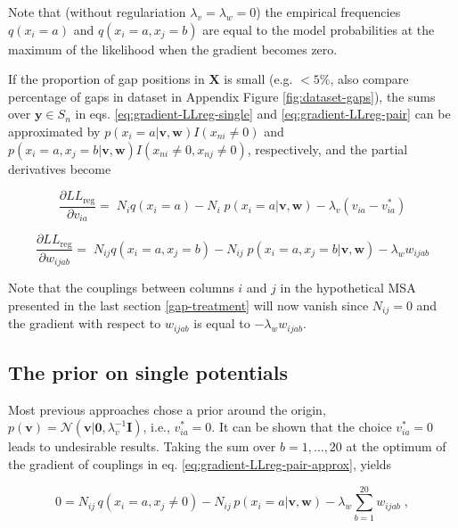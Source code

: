 \documentclass[11pt,a4paper,twoside]{book}
\newcommand{\eq}{\!=\!}
\newcommand{\Gauss}{\mathcal{N}}
\newcommand{\I}{\mathbf{I}}
\newcommand{\LLreg}{L\!L_\mathrm{reg}}
\newcommand{\Sn}{S_n}
\renewcommand{\v}{\mathbf{v}}
\newcommand{\via}{v_{ia}}
\newcommand{\w}{\mathbf{w}}
\newcommand{\wijab}{w_{ijab}}
\newcommand{\X}{\mathbf{X}}
\theoremstyle{definition}
\theoremstyle{definition}
\theoremstyle{remark}
\begin{document}
Note that (without regulariation \(\lambda_v = \lambda_w = 0\)) the
empirical frequencies \(q(x_i \eq a)\) and \(q(x_i \eq a, x_j=b)\) are
equal to the model probabilities at the maximum of the likelihood when
the gradient becomes zero.

If the proportion of gap positions in \(\X\) is small (e.g. \(<5\%\),
also compare percentage of gaps in dataset in Appendix Figure
\ref{fig:dataset-gaps}), the sums over \(\mathbf{y} \in \Sn\) in eqs.
\eqref{eq:gradient-LLreg-single} and \eqref{eq:gradient-LLreg-pair} can be
approximated by \(p(x_i=a | \v,\w) I(x_{ni} \ne 0)\) and
\(p(x_i=a, x_j=b | \v,\w) I(x_{ni} \ne 0, x_{nj} \ne 0)\), respectively,
and the partial derivatives become

\begin{equation}
  \frac{\partial \LLreg}{\partial \via}   = \; N_i q(x_i \eq a) -  N_i \; p(x_i \eq a  | \v,\w)  - \lambda_v (\via - \via^*)
\label{eq:gradient-LLreg-single-approx}
\end{equation}

\begin{equation}
  \frac{\partial \LLreg}{\partial \wijab} = \; N_{ij} q(x_i \eq a, x_j=b) - N_{ij} \; p(x_i \eq a, x_j \eq b | \v,\w) - \lambda_w \wijab
\label{eq:gradient-LLreg-pair-approx}
\end{equation}

Note that the couplings between columns \(i\) and \(j\) in the
hypothetical MSA presented in the last section \ref{gap-treatment} will
now vanish since \(N_{ij} \eq 0\) and the gradient with respect to
\(\wijab\) is equal to \(-\lambda_w \wijab\).

\subsection{The prior on single potentials}\label{prior-v}

Most previous approaches chose a prior around the origin,
\(p(\v) = \Gauss ( \v| \mathbf{0}, \lambda_v^{-1} \I)\), i.e.,
\(\via^* \eq 0\). It can be shown that the choice \(\via^* \eq 0\) leads
to undesirable results. Taking the sum over \(b=1,\ldots, 20\) at the
optimum of the gradient of couplings in eq.
\eqref{eq:gradient-LLreg-pair-approx}, yields

\begin{equation}
    0 =   N_{ij}\, q(x_i \eq a, x_j \ne 0)   - N_{ij}\, p(x_i \eq a | \v, \w)  - \lambda_w \sum_{b=1}^{20} \wijab \; ,
    \label{eq:sum-over-b-at-optimum}
\end{equation}
\end{document}

